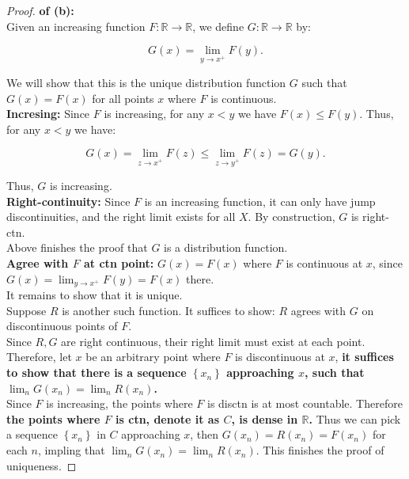 \begin{proof}

\textbf{of (b):}\\
Given an increasing function \(F:\mathbb{R}\rightarrow\mathbb{R}\), we define \(G:\mathbb{R}\rightarrow\mathbb{R}\) by:

\[G(x) = \lim\limits_{y\rightarrow x^{+}}F(y).\]

We will show that this is the unique distribution function \(G\) such that \(G(x) = F(x)\) for all points \(x\) where \(F\) is continuous.\\
\textbf{Incresing:} Since \(F\) is increasing, for any \(x < y\) we have \(F(x) \leq F(y)\). Thus, for any \(x < y\) we have:

\[G(x) = \lim\limits_{z\rightarrow x^{+}}F(z) \leq \lim\limits_{z\rightarrow y^{+}}F(z) = G(y).\]

Thus, \(G\) is increasing.\\
\textbf{Right-continuity:} Since \(F\) is an increasing function, it can only have jump discontinuities, and the right limit exists for all \(X\). By construction, \(G\) is right-ctn.\\
Above finishes the proof that \(G\) is a distribution function.\\
\textbf{Agree with \(F\) at ctn point:} \(G(x) = F(x)\) where \(F\) is continuous at \(x\), since \(G(x) = \lim_{y\rightarrow x^{+}}F(y) = F(x)\) there.\\
It remains to show that it is unique.\\
Suppose \(R\) is another such function. It suffices to show: \(R\) agrees with \(G\) on discontinuous points of \(F\).\\
Since \(R,G\) are right continuous, their right limit must exist at each point. Therefore, let \(x\) be an arbitrary point where \(F\) is discontinuous at \(x\), \textbf{it suffices to show that there is a sequence \(\left\{ x_{n} \right\}\) approaching \(x\), such that \(\lim_{n}G(x_{n}) = \lim_{n}R(x_{n})\).}\\
Since \(F\) is increasing, the points where \(F\) is disctn is at most countable. Therefore \textbf{the points where \(F\) is ctn, denote it as \(C\), is dense in \(\mathbb{R}\).} Thus we can pick a sequence \(\left\{ x_{n} \right\}\) in \(C\) approaching \(x\), then \(G(x_{n}) = R(x_{n}) = F(x_{n})\) for each \(n\), impling that \(\lim_{n}G(x_{n}) = \lim_{n}R(x_{n})\). This finishes the proof of uniqueness.

\end{proof}

